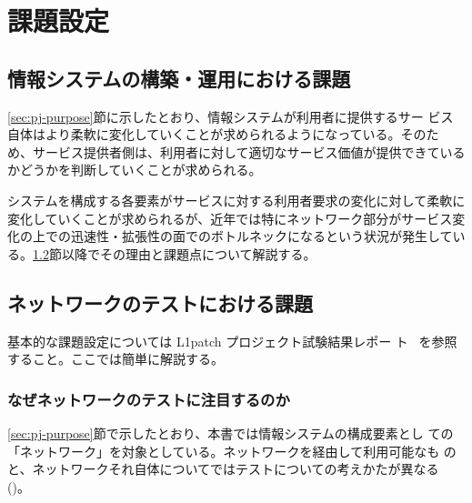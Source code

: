 
\chapter{課題設定}
\label{chap:problem-setting}

 \section{情報システムの構築・運用における課題}
 \label{sec:system-problem}

\ref{sec:pj-purpose}節に示したとおり、情報システムが利用者に提供するサー
ビス自体はより柔軟に変化していくことが求められるようになっている。そのた
め、サービス提供者側は、利用者に対して適切なサービス価値が提供できている
かどうかを判断していくことが求められる。

システムを構成する各要素がサービスに対する利用者要求の変化に対して柔軟に
変化していくことが求められるが、近年では特にネットワーク部分がサービス変
化の上での迅速性・拡張性の面でのボトルネックになるという状況が発生してい
る。\ref{sec:nw-test-problem}節以降でその理由と課題点について解説する。

 \section{ネットワークのテストにおける課題}
 \label{sec:nw-test-problem}


基本的な課題設定については L1patch プロジェクト試験結果レポー
ト~\cite{l1pjpoc} を参照すること。ここでは簡単に解説する。

  \subsection{なぜネットワークのテストに注目するのか}
  \label{sec:reason-to-focus-network}

\ref{sec:pj-purpose}節で示したとおり、本書では情報システムの構成要素とし
ての「ネットワーク」を対象としている。ネットワークを経由して利用可能なも
のと、ネットワークそれ自体についてではテストについての考えかたが異なる
()。

